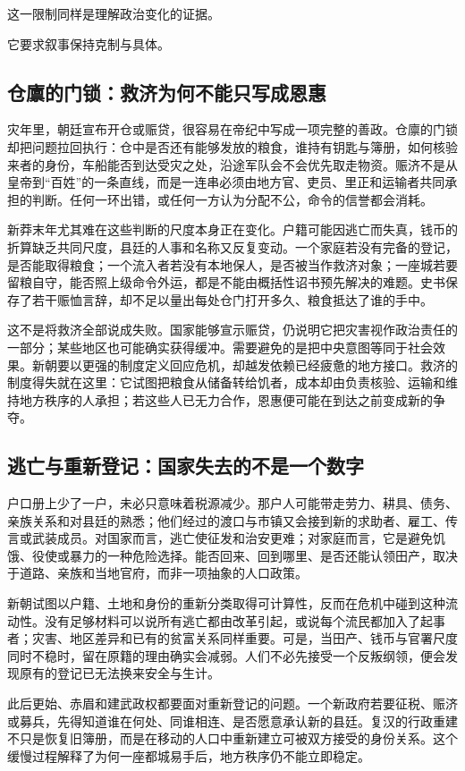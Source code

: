 这一限制同样是理解政治变化的证据。

它要求叙事保持克制与具体。

\subsection{仓廪的门锁：救济为何不能只写成恩惠}

灾年里，朝廷宣布开仓或赈贷，很容易在帝纪中写成一项完整的善政。仓廪的门锁却把问题拉回执行：仓中是否还有能够发放的粮食，谁持有钥匙与簿册，如何核验来者的身份，车船能否到达受灾之处，沿途军队会不会优先取走物资。赈济不是从皇帝到“百姓”的一条直线，而是一连串必须由地方官、吏员、里正和运输者共同承担的判断。任何一环出错，或任何一方认为分配不公，命令的信誉都会消耗。

新莽末年尤其难在这些判断的尺度本身正在变化。户籍可能因逃亡而失真，钱币的折算缺乏共同尺度，县廷的人事和名称又反复变动。一个家庭若没有完备的登记，是否能取得粮食；一个流入者若没有本地保人，是否被当作救济对象；一座城若要留粮自守，能否照上级命令外运，都是不能由概括性诏书预先解决的难题。史书保存了若干赈恤言辞，却不足以量出每处仓门打开多久、粮食抵达了谁的手中。

这不是将救济全部说成失败。国家能够宣示赈贷，仍说明它把灾害视作政治责任的一部分；某些地区也可能确实获得缓冲。需要避免的是把中央意图等同于社会效果。新朝要以更强的制度定义回应危机，却越发依赖已经疲惫的地方接口。救济的制度得失就在这里：它试图把粮食从储备转给饥者，成本却由负责核验、运输和维持地方秩序的人承担；若这些人已无力合作，恩惠便可能在到达之前变成新的争夺。

\subsection{逃亡与重新登记：国家失去的不是一个数字}

户口册上少了一户，未必只意味着税源减少。那户人可能带走劳力、耕具、债务、亲族关系和对县廷的熟悉；他们经过的渡口与市镇又会接到新的求助者、雇工、传言或武装成员。对国家而言，逃亡使征发和治安更难；对家庭而言，它是避免饥饿、役使或暴力的一种危险选择。能否回来、回到哪里、是否还能认领田产，取决于道路、亲族和当地官府，而非一项抽象的人口政策。

新朝试图以户籍、土地和身份的重新分类取得可计算性，反而在危机中碰到这种流动性。没有足够材料可以说所有逃亡都由改革引起，或说每个流民都加入了起事者；灾害、地区差异和已有的贫富关系同样重要。可是，当田产、钱币与官署尺度同时不稳时，留在原籍的理由确实会减弱。人们不必先接受一个反叛纲领，便会发现原有的登记已无法换来安全与生计。

此后更始、赤眉和建武政权都要面对重新登记的问题。一个新政府若要征税、赈济或募兵，先得知道谁在何处、同谁相连、是否愿意承认新的县廷。复汉的行政重建不只是恢复旧簿册，而是在移动的人口中重新建立可被双方接受的身份关系。这个缓慢过程解释了为何一座都城易手后，地方秩序仍不能立即稳定。

